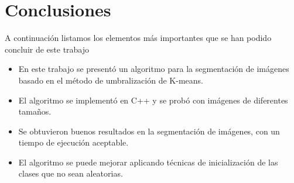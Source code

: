 \section{Conclusiones}\label{sec:conclusions}

A continuación listamos los elementos más importantes que se han podido concluir de este trabajo

\begin{itemize}
    \item En este trabajo se presentó un algoritmo para la segmentación de imágenes basado en el método de umbralización de K-means.
    \item El algoritmo se implementó en C++ y se probó con imágenes de diferentes tamaños.
    \item Se obtuvieron buenos resultados en la segmentación de imágenes, con un tiempo de ejecución aceptable.
    \item El algoritmo se puede mejorar aplicando técnicas de inicialización de las clases que no sean aleatorias.
\end{itemize}
